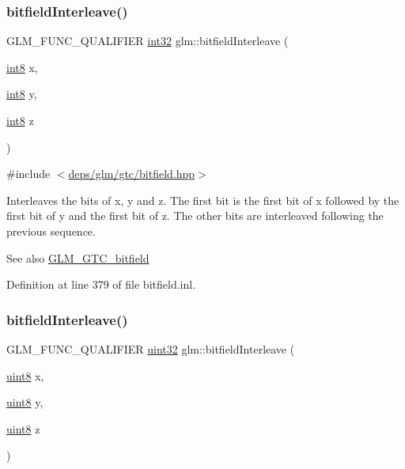 \subsubsection{\texorpdfstring{bitfield\+Interleave()}{bitfieldInterleave()}\hspace{0.1cm}{\footnotesize\ttfamily [7/16]}}
{\footnotesize\ttfamily G\+L\+M\+\_\+\+F\+U\+N\+C\+\_\+\+Q\+U\+A\+L\+I\+F\+I\+ER \hyperlink{group__gtc__type__precision_ga632d8b25f6b61659f39ea4321fab92a4}{int32} glm\+::bitfield\+Interleave (\begin{DoxyParamCaption}\item[{\hyperlink{group__gtc__type__precision_ga96254f9c1c4506fc8eb5cf3301ce8565}{int8}}]{x,  }\item[{\hyperlink{group__gtc__type__precision_ga96254f9c1c4506fc8eb5cf3301ce8565}{int8}}]{y,  }\item[{\hyperlink{group__gtc__type__precision_ga96254f9c1c4506fc8eb5cf3301ce8565}{int8}}]{z }\end{DoxyParamCaption})}



{\ttfamily \#include $<$\hyperlink{bitfield_8hpp}{deps/glm/gtc/bitfield.\+hpp}$>$}

Interleaves the bits of x, y and z. The first bit is the first bit of x followed by the first bit of y and the first bit of z. The other bits are interleaved following the previous sequence.

\begin{DoxySeeAlso}{See also}
\hyperlink{group__gtc__bitfield}{G\+L\+M\+\_\+\+G\+T\+C\+\_\+bitfield} 
\end{DoxySeeAlso}


Definition at line 379 of file bitfield.\+inl.

\mbox{\label{group__gtc__bitfield_gab9d593a2e916beb8f8137a0dbeae3afe}} 
\subsubsection{\texorpdfstring{bitfield\+Interleave()}{bitfieldInterleave()}\hspace{0.1cm}{\footnotesize\ttfamily [8/16]}}
{\footnotesize\ttfamily G\+L\+M\+\_\+\+F\+U\+N\+C\+\_\+\+Q\+U\+A\+L\+I\+F\+I\+ER \hyperlink{group__gtc__type__precision_ga202b6a53c105fcb7e531f9b443518451}{uint32} glm\+::bitfield\+Interleave (\begin{DoxyParamCaption}\item[{\hyperlink{group__gtc__type__precision_ga1a7dcd8aac97cc8020817c94049deff2}{uint8}}]{x,  }\item[{\hyperlink{group__gtc__type__precision_ga1a7dcd8aac97cc8020817c94049deff2}{uint8}}]{y,  }\item[{\hyperlink{group__gtc__type__precision_ga1a7dcd8aac97cc8020817c94049deff2}{uint8}}]{z }\end{DoxyParamCaption})}



